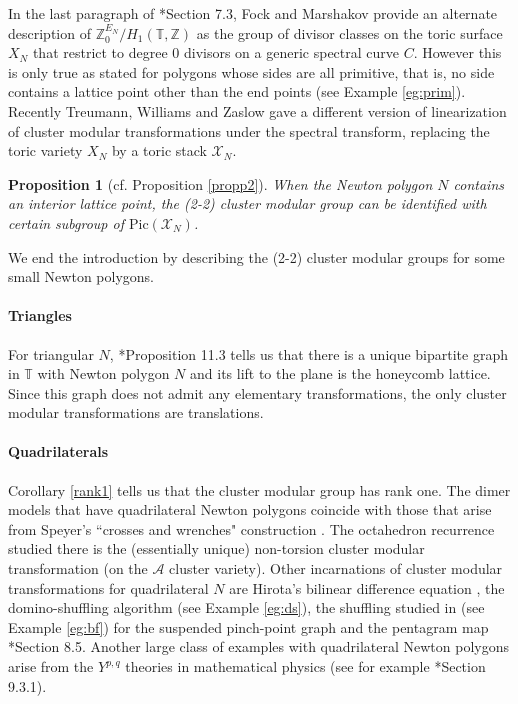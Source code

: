 \documentclass[11pt]{article} %
\newtheorem{proposition}[theorem]{Proposition}
\theoremstyle{definition}
\newcommand{\Z}{{\mathbb Z}}
\newcommand{\T}{{\mathbb T}}
\begin{document}
In the last paragraph of \cite{FM16}*{Section 7.3}, Fock and Marshakov provide an alternate description of $\Z^{E_N}_0/H_1(\mathbb T,\Z)$ as the group of divisor classes on the toric surface $X_N$ that restrict to degree $0$ divisors on a generic spectral curve $C$. However this is only true as stated for polygons whose sides are all primitive, that is, no side contains a lattice point other than the end points (see Example \ref{eg:prim}). Recently Treumann, Williams and Zaslow  \cite{TWZ18} gave a different version of linearization of cluster modular transformations under the spectral transform, replacing the toric variety $X_N$ by a toric stack $\mathcal X_N$. 

\begin{proposition}[cf. Proposition \ref{propp2}]\label{mainthm1}
When the Newton polygon $N$ contains an interior lattice point, the (2-2) cluster modular group can be identified with certain subgroup of $\text{Pic}(\mathscr X_N)$.
\end{proposition}

We end the introduction by describing the (2-2) cluster modular groups for some small Newton polygons.

\paragraph{Triangles}
For triangular $N$, \cite{IU15}*{Proposition 11.3} tells us that there is a unique bipartite graph in $\T$ with Newton polygon $N$ and its lift to the plane is the honeycomb lattice. Since this graph does not admit any elementary transformations, the only cluster modular transformations are translations.

\paragraph{Quadrilaterals}

Corollary \ref{rank1} tells us that the cluster modular group has rank one. The dimer models that have quadrilateral Newton polygons coincide with those that arise from Speyer's ``crosses and wrenches" construction \cite{Speyer}. The octahedron recurrence studied there is the (essentially unique) non-torsion cluster modular transformation (on the $\mathcal A$ cluster variety). Other incarnations of cluster modular transformations for quadrilateral $N$ are Hirota's bilinear difference equation \cite{Miwa}, the domino-shuffling algorithm \cites{EKLP,Propp03} (see Example \ref{eg:ds}), the shuffling studied in \cite{BF18} (see Example \ref{eg:bf}) for the suspended pinch-point graph and the pentagram map \cite{FM16}*{Section 8.5}. Another large class of examples with quadrilateral Newton polygons arise from the $Y^{p,q}$ theories in mathematical physics (see for example \cite{Franco2006BraneDA}*{Section 9.3.1}).
\end{document}
